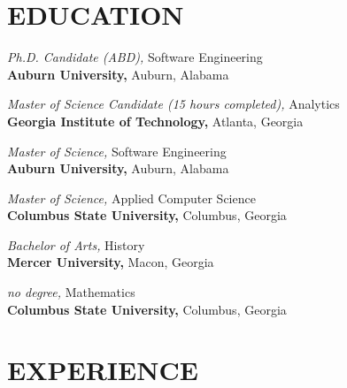 \documentclass[margin, 10pt]{res} %
\begin{document}
\begin{resume}

\section{EDUCATION}

    {\it Ph.D. Candidate (ABD),} Software Engineering\\
\textbf{Auburn University,} Auburn, Alabama

    {\it Master of Science Candidate (15 hours completed),} Analytics\\
\textbf{Georgia Institute of Technology,} Atlanta, Georgia

{\it Master of Science,} Software Engineering\\
\textbf{Auburn University,} Auburn, Alabama

{\it Master of Science,} Applied Computer Science\\
\textbf{Columbus State University,} Columbus, Georgia

{\it Bachelor of Arts,} History\\
\textbf{Mercer University,} Macon, Georgia

{\it no degree,} Mathematics\\
\textbf{Columbus State University,} Columbus, Georgia

 
\section{EXPERIENCE}
 
%



\end{resume}
\end{document}
